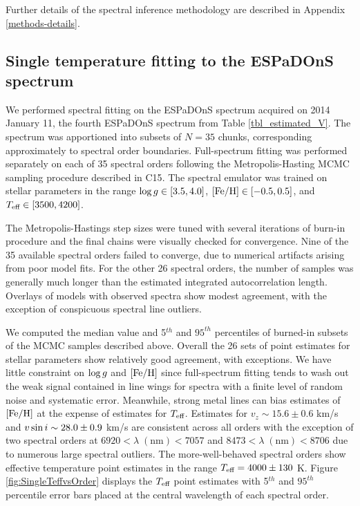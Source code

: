 \documentclass[12pt]{report}
\newcommand{\iancze}{{\sc C15}}
\begin{document}
Further details of the spectral inference methodology are described in Appendix \ref{methods-details}.


\subsection{Single temperature fitting to the ESPaDOnS spectrum}\label{sec:ESP_starfish}

We performed spectral fitting on the ESPaDOnS spectrum acquired on 2014 January 11, the fourth ESPaDOnS spectrum from Table \ref{tbl_estimated_V}.  The spectrum was apportioned into subsets of $N=35$ chunks, corresponding approximately to spectral order boundaries.  Full-spectrum fitting was performed separately on each of 35 spectral orders following the Metropolis-Hasting MCMC sampling procedure described in \iancze.  The spectral emulator was trained on stellar parameters in the range $\log g \in [3.5, 4.0]$, $[{\rm Fe}/{\rm H}] \in [-0.5, 0.5]$, and $T_\textrm{eff} \in [3500, 4200]$.

The Metropolis-Hastings step sizes were tuned with several iterations of burn-in procedure and the final chains were visually checked for convergence.  Nine of the 35 available spectral orders failed to converge, due to numerical artifacts arising from poor model fits.  For the other 26 spectral orders, the number of samples was generally much longer than the estimated integrated autocorrelation length.  Overlays of models with observed spectra show modest agreement, with the exception of conspicuous spectral line outliers.

We computed the median value and 5$^{th}$ and $95^{th}$ percentiles of burned-in subsets of the MCMC samples described above.  Overall the 26 sets of point estimates for stellar parameters show relatively good agreement, with exceptions.  We have little constraint on $\log g$ and $[{\rm Fe}/{\rm H}]$ since full-spectrum fitting tends to wash out the weak signal contained in line wings for spectra with a finite level of random noise and systematic error.  Meanwhile, strong metal lines can bias estimates of $[{\rm Fe}/{\rm H}]$ at the expense of estimates for $T_\textrm{eff}$.  Estimates for $v_z \sim 15.6 \pm 0.6$ km/s and $v \sin i \sim 28.0 \pm 0.9$ km/s are consistent across all orders with the exception of two spectral orders at $6920 <\lambda \;(\mathrm{nm})< 7057$ and $8473 < \lambda \;(\mathrm{nm}) < 8706$ due to numerous large spectral outliers.  The more-well-behaved spectral orders show effective temperature point estimates in the range $T_\textrm{eff}=4000\pm130$ K.  Figure \ref{fig:SingleTeffvsOrder} displays the $T_\textrm{eff}$ point estimates with 5$^{th}$ and $95^{th}$ percentile error bars placed at the central wavelength of each spectral order.
\end{document}
